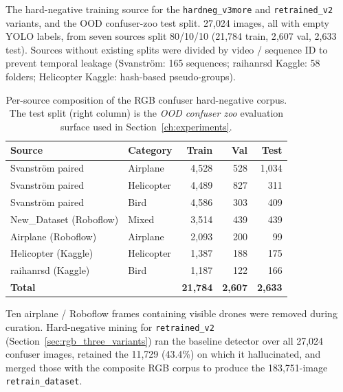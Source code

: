 The hard-negative training source for the \texttt{hardneg\_v3more} and \texttt{retrained\_v2} variants, and the OOD confuser-zoo test split. 27{,}024 images, all with empty YOLO labels, from seven sources split 80/10/10 (21{,}784 train, 2{,}607 val, 2{,}633 test). Sources without existing splits were divided by video / sequence ID to prevent temporal leakage (Svanstr\"om: 165 sequences; raihanrsd Kaggle: 58 folders; Helicopter Kaggle: hash-based pseudo-groups).

\begin{table}[htbp]
    \centering
    \caption{Per-source composition of the RGB confuser hard-negative corpus. The test split (right column) is the \emph{OOD confuser zoo} evaluation surface used in Section~\ref{ch:experiments}.}
    \label{tab:ds_confusers}
    \begin{tabular}{llrrr}
        \toprule
        Source & Category & Train & Val & Test \\
        \midrule
        Svanstr\"om paired & Airplane    & 4{,}528 &   528 & 1{,}034 \\
        Svanstr\"om paired & Helicopter  & 4{,}489 &   827 &    311 \\
        Svanstr\"om paired & Bird        & 4{,}586 &   303 &    409 \\
        New\_Dataset (Roboflow) & Mixed  & 3{,}514 &   439 &    439 \\
        Airplane (Roboflow) & Airplane   & 2{,}093 &   200 &     99 \\
        Helicopter (Kaggle) & Helicopter & 1{,}387 &   188 &    175 \\
        raihanrsd (Kaggle) & Bird        & 1{,}187 &   122 &    166 \\
        \midrule
        \textbf{Total}     &             & \textbf{21{,}784} & \textbf{2{,}607} & \textbf{2{,}633} \\
        \bottomrule
    \end{tabular}
\end{table}

Ten airplane / Roboflow frames containing visible drones were removed during curation. Hard-negative mining for \texttt{retrained\_v2} (Section~\ref{sec:rgb_three_variants}) ran the baseline detector over all 27{,}024 confuser images, retained the 11{,}729 (43.4\%) on which it hallucinated, and merged those with the composite RGB corpus to produce the 183{,}751-image \texttt{retrain\_dataset}.

